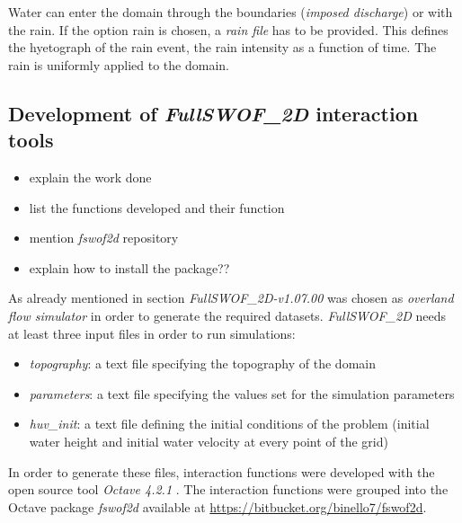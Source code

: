 Water can enter the domain through the boundaries (\emph{imposed discharge}) or with the rain. If the option rain is chosen, a \emph{rain file} has to be provided. This defines the hyetograph of the rain event, the rain intensity as a function of time. The rain is uniformly applied to the domain.


\subsection{Development of \textit{FullSWOF\_2D} interaction tools}
\label{sec:fswof_interaction_tools}

\begin{itemize}
\itemsep0em
  \item explain the work done
  \item list the functions developed and their function
  \item mention \textit{fswof2d} repository
  \item explain how to install the package?? 
\end{itemize}

As already mentioned in section  \textit{FullSWOF\_2D-v1.07.00} was chosen as \emph{overland flow simulator} in order to generate the required datasets.
\textit{FullSWOF\_2D} needs at least three input files in order to run simulations:

\begin{itemize}
\itemsep0em
  \item \textit{topography}: a text file specifying the topography of the domain
  \item \textit{parameters}: a text file specifying the values set for the simulation parameters
  \item \textit{huv\_init}: a text file defining the initial conditions of the problem (initial water height and initial water velocity at every point of the grid)
\end{itemize}

In order to generate these files, interaction functions were developed with the open source tool \textit{Octave 4.2.1} \autocite{octave_community_gnu_2018}.
The interaction functions were grouped into the Octave package \textit{fswof2d} available at \url{https://bitbucket.org/binello7/fswof2d}.\\

